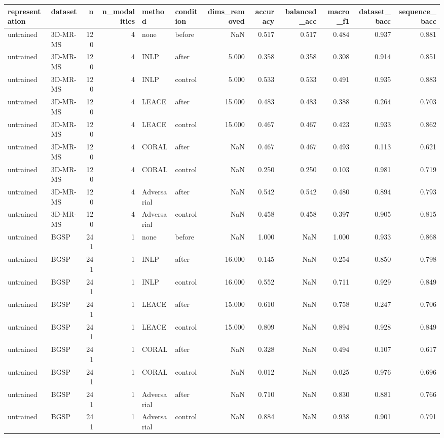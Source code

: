 \begin{tabular}{llrrllrrrrrr}
\toprule
representation & dataset & n & n\_modalities & method & condition & dims\_removed & accuracy & balanced\_acc & macro\_f1 & dataset\_bacc & sequence\_bacc \\
\midrule
untrained & 3D-MR-MS & 120 & 4 & none & before & NaN & 0.517 & 0.517 & 0.484 & 0.937 & 0.881 \\
untrained & 3D-MR-MS & 120 & 4 & INLP & after & 5.000 & 0.358 & 0.358 & 0.308 & 0.914 & 0.851 \\
untrained & 3D-MR-MS & 120 & 4 & INLP & control & 5.000 & 0.533 & 0.533 & 0.491 & 0.935 & 0.883 \\
untrained & 3D-MR-MS & 120 & 4 & LEACE & after & 15.000 & 0.483 & 0.483 & 0.388 & 0.264 & 0.703 \\
untrained & 3D-MR-MS & 120 & 4 & LEACE & control & 15.000 & 0.467 & 0.467 & 0.423 & 0.933 & 0.862 \\
untrained & 3D-MR-MS & 120 & 4 & CORAL & after & NaN & 0.467 & 0.467 & 0.493 & 0.113 & 0.621 \\
untrained & 3D-MR-MS & 120 & 4 & CORAL & control & NaN & 0.250 & 0.250 & 0.103 & 0.981 & 0.719 \\
untrained & 3D-MR-MS & 120 & 4 & Adversarial & after & NaN & 0.542 & 0.542 & 0.480 & 0.894 & 0.793 \\
untrained & 3D-MR-MS & 120 & 4 & Adversarial & control & NaN & 0.458 & 0.458 & 0.397 & 0.905 & 0.815 \\
untrained & BGSP & 241 & 1 & none & before & NaN & 1.000 & NaN & 1.000 & 0.933 & 0.868 \\
untrained & BGSP & 241 & 1 & INLP & after & 16.000 & 0.145 & NaN & 0.254 & 0.850 & 0.798 \\
untrained & BGSP & 241 & 1 & INLP & control & 16.000 & 0.552 & NaN & 0.711 & 0.929 & 0.849 \\
untrained & BGSP & 241 & 1 & LEACE & after & 15.000 & 0.610 & NaN & 0.758 & 0.247 & 0.706 \\
untrained & BGSP & 241 & 1 & LEACE & control & 15.000 & 0.809 & NaN & 0.894 & 0.928 & 0.849 \\
untrained & BGSP & 241 & 1 & CORAL & after & NaN & 0.328 & NaN & 0.494 & 0.107 & 0.617 \\
untrained & BGSP & 241 & 1 & CORAL & control & NaN & 0.012 & NaN & 0.025 & 0.976 & 0.696 \\
untrained & BGSP & 241 & 1 & Adversarial & after & NaN & 0.710 & NaN & 0.830 & 0.881 & 0.766 \\
untrained & BGSP & 241 & 1 & Adversarial & control & NaN & 0.884 & NaN & 0.938 & 0.901 & 0.791 \\

\end{tabular}
